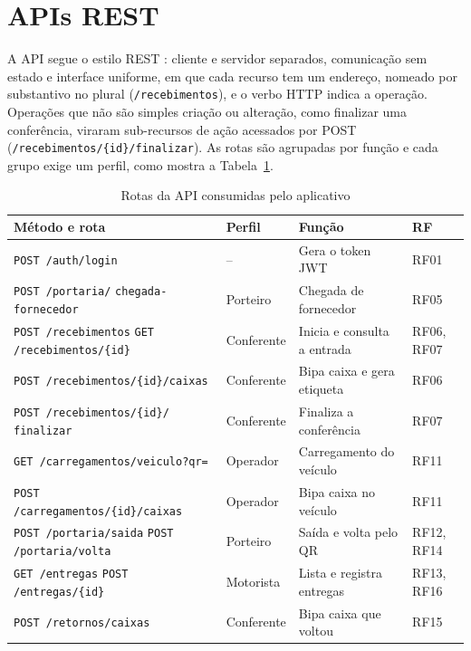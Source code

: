 \section{APIs REST}

A API segue o estilo REST \cite{fielding2000}: cliente e servidor separados, comunicação sem estado e interface uniforme, em que cada recurso tem um endereço, nomeado por substantivo no plural (\texttt{/recebimentos}), e o verbo HTTP indica a operação. Operações que não são simples criação ou alteração, como finalizar uma conferência, viraram sub-recursos de ação acessados por POST (\texttt{/recebimentos/\{id\}/finalizar}). As rotas são agrupadas por função e cada grupo exige um perfil, como mostra a Tabela~\ref{tab:rotas}.

\begin{table}[htbp]
\centering
\caption{Rotas da API consumidas pelo aplicativo}
\label{tab:rotas}
\footnotesize
\begin{tabular}{|p{6.6cm}|p{2.1cm}|p{3.6cm}|p{1.7cm}|}
\hline
\textbf{Método e rota} & \textbf{Perfil} & \textbf{Função} & \textbf{RF} \\ \hline
\texttt{POST /auth/login} & -- & Gera o token JWT & RF01 \\ \hline
\texttt{POST /portaria/} \newline \texttt{chegada-fornecedor} & Porteiro & Chegada de fornecedor & RF05 \\ \hline
\texttt{POST /recebimentos} \newline \texttt{GET /recebimentos/\{id\}} & Conferente & Inicia e consulta a entrada & RF06, RF07 \\ \hline
\texttt{POST /recebimentos/\{id\}/caixas} & Conferente & Bipa caixa e gera etiqueta & RF06 \\ \hline
\texttt{POST /recebimentos/\{id\}/} \newline \texttt{finalizar} & Conferente & Finaliza a conferência & RF07 \\ \hline
\texttt{GET /carregamentos/veiculo?qr=} & Operador & Carregamento do veículo & RF11 \\ \hline
\texttt{POST /carregamentos/\{id\}/caixas} & Operador & Bipa caixa no veículo & RF11 \\ \hline
\texttt{POST /portaria/saida} \newline \texttt{POST /portaria/volta} & Porteiro & Saída e volta pelo QR & RF12, RF14 \\ \hline
\texttt{GET /entregas} \newline \texttt{POST /entregas/\{id\}} & Motorista & Lista e registra entregas & RF13, RF16 \\ \hline
\texttt{POST /retornos/caixas} & Conferente & Bipa caixa que voltou & RF15 \\ \hline
\end{tabular}
\end{table}

